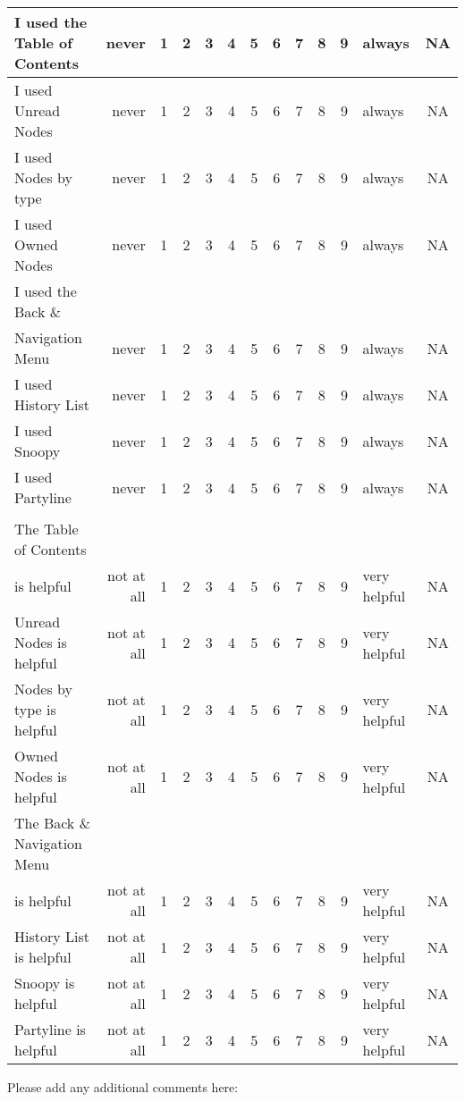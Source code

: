 \begin{tabular}{lrccccccccclc}\\
\hline
I used the Table of Contents&never&1 &2 &3 &4 &5 &6 &7 &8 &9 &always&NA\\
\hline
I used Unread Nodes&never&1 &2 &3 &4 &5 &6 &7 &8 &9 &always&NA\\
\hline
I used Nodes by type&never&1 &2 &3 &4 &5 &6 &7 &8 &9 &always&NA\\
\hline
I used Owned Nodes&never&1 &2 &3 &4 &5 &6 &7 &8 &9 &always&NA\\
\hline
I used the Back \& &&&&&&&&&&&&\\Navigation Menu&never&1 &2 &3 &4 &5 &6 &7 &8 &9 &always&NA\\
\hline
I used History List&never&1 &2 &3 &4 &5 &6 &7 &8 &9 &always&NA\\
\hline
I used Snoopy&never&1 &2 &3 &4 &5 &6 &7 &8 &9 &always&NA\\
\hline
I used Partyline&never&1 &2 &3 &4 &5 &6 &7 &8 &9 &always&NA\\
\hline
\\
The Table of Contents&&&&&&&&&&&&\\ is helpful&not at all&1 &2 &3 &4 &5 &6 &7 &8 &9 &very helpful&NA\\
\hline
Unread Nodes is helpful&not at all&1 &2 &3 &4 &5 &6 &7 &8 &9 &very helpful&NA\\
\hline
Nodes by type is helpful&not at all&1 &2 &3 &4 &5 &6 &7 &8 &9 &very helpful&NA\\
\hline
Owned Nodes is helpful&not at all&1 &2 &3 &4 &5 &6 &7 &8 &9 &very helpful&NA\\
\hline
The Back \& Navigation Menu&&&&&&&&&&&&\\
 is helpful&not at all&1 &2 &3 &4 &5 &6 &7 &8 &9
&very helpful&NA\\
\hline
History List is helpful&not at all&1 &2 &3 &4 &5 &6 &7 &8 &9 &very helpful&NA\\
\hline
Snoopy is helpful&not at all&1 &2 &3 &4 &5 &6 &7 &8 &9 &very helpful&NA\\
\hline
Partyline is helpful&not at all&1 &2 &3 &4 &5 &6 &7 &8 &9 &very helpful&NA\\
\hline

\end{tabular}

Please add any additional comments here:
\newpage
{}


\nocite{Baecker93}
\nocite{Berners-Lee94}
\nocite{Bruce93}
\nocite{Buxton90}
\nocite{Cogn90}
\nocite{Conklin87}
\nocite{Conklin88}
\nocite{Ellis88}
\nocite{Ellis91}
\nocite{Fish88}
\nocite{Haake92}
\nocite{Halasz87}
\nocite{Marshall89}
\nocite{Neuwirth90}
\nocite{Neuwirth92}
\nocite{Smith87}
\nocite{Trigg88}









